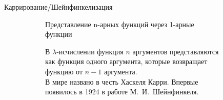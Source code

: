 \begin{frame}{Каррирование/Шейнфинкелизация}
\begin{figure}[t]
  \begin{subfigure}[t]{0.4 \textwidth}
        \vspace{-10em}
\begin{definition}%
Представление n-арных функций через 1-арные функции
\end{definition}

\vspace{1em}

В $\lambda$-исчислении функция $n$ аргументов представляются как функция одного аргумента, которые возвращает функцию от $n-1$ аргумента.\\

В мире названо в честь Хаскеля Карри. Впервые появилось в 1924 в работе М.~И.~Шейнфинкеля.\\



\end{subfigure}
\end{figure}
\end{frame}
